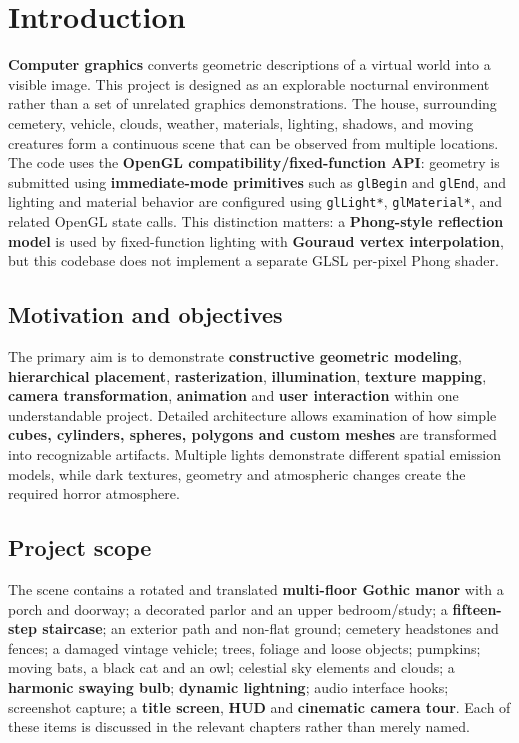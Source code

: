 \documentclass[10pt,a4paper,oneside]{article}
\begin{document}
\section{Introduction}
\textbf{Computer graphics} converts geometric descriptions of a virtual world into a visible image. This project is designed as an explorable nocturnal environment rather than a set of unrelated graphics demonstrations. The house, surrounding cemetery, vehicle, clouds, weather, materials, lighting, shadows, and moving creatures form a continuous scene that can be observed from multiple locations. The code uses the \textbf{OpenGL compatibility/fixed-function API}: geometry is submitted using \textbf{immediate-mode primitives} such as \texttt{glBegin} and \texttt{glEnd}, and lighting and material behavior are configured using \texttt{glLight*}, \texttt{glMaterial*}, and related OpenGL state calls. This distinction matters: a \textbf{Phong-style reflection model} is used by fixed-function lighting with \textbf{Gouraud vertex interpolation}, but this codebase does not implement a separate GLSL per-pixel Phong shader.

\subsection{Motivation and objectives}
The primary aim is to demonstrate \textbf{constructive geometric modeling}, \textbf{hierarchical placement}, \textbf{rasterization}, \textbf{illumination}, \textbf{texture mapping}, \textbf{camera transformation}, \textbf{animation} and \textbf{user interaction} within one understandable project. Detailed architecture allows examination of how simple \textbf{cubes, cylinders, spheres, polygons and custom meshes} are transformed into recognizable artifacts. Multiple lights demonstrate different spatial emission models, while dark textures, geometry and atmospheric changes create the required horror atmosphere.

\subsection{Project scope}
The scene contains a rotated and translated \textbf{multi-floor Gothic manor} with a porch and doorway; a decorated parlor and an upper bedroom/study; a \textbf{fifteen-step staircase}; an exterior path and non-flat ground; cemetery headstones and fences; a damaged vintage vehicle; trees, foliage and loose objects; pumpkins; moving bats, a black cat and an owl; celestial sky elements and clouds; a \textbf{harmonic swaying bulb}; \textbf{dynamic lightning}; audio interface hooks; screenshot capture; a \textbf{title screen}, \textbf{HUD} and \textbf{cinematic camera tour}. Each of these items is discussed in the relevant chapters rather than merely named.
\end{document}
